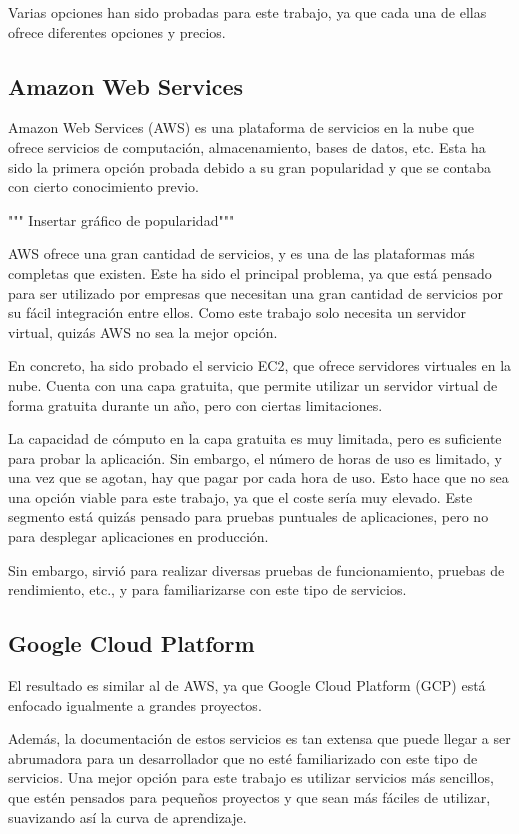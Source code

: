 Varias opciones han sido probadas para este trabajo, ya que cada una de ellas ofrece diferentes opciones y precios.

\subsection{Amazon Web Services}
Amazon Web Services (AWS) es una plataforma de servicios en la nube que ofrece servicios de computación, almacenamiento, bases de datos, etc.
Esta ha sido la primera opción probada debido a su gran popularidad y que se contaba con cierto conocimiento previo.

""" Insertar gráfico de popularidad"""

AWS ofrece una gran cantidad de servicios, y es una de las plataformas más completas que existen.
Este ha sido el principal problema, ya que está pensado para ser utilizado por empresas que necesitan una gran cantidad de servicios por su fácil integración entre ellos.
Como este trabajo solo necesita un servidor virtual, quizás AWS no sea la mejor opción.

En concreto, ha sido probado el servicio EC2, que ofrece servidores virtuales en la nube.
Cuenta con una capa gratuita, que permite utilizar un servidor virtual de forma gratuita durante un año, pero con ciertas limitaciones.

La capacidad de cómputo en la capa gratuita es muy limitada, pero es suficiente para probar la aplicación.
Sin embargo, el número de horas de uso es limitado, y una vez que se agotan, hay que pagar por cada hora de uso.
Esto hace que no sea una opción viable para este trabajo, ya que el coste sería muy elevado.
Este segmento está quizás pensado para pruebas puntuales de aplicaciones, pero no para desplegar aplicaciones en producción.

Sin embargo, sirvió para realizar diversas pruebas de funcionamiento, pruebas de rendimiento, etc., y para familiarizarse con este tipo de servicios.


\subsection{Google Cloud Platform}
El resultado es similar al de AWS, ya que Google Cloud Platform (GCP) está enfocado igualmente a grandes proyectos.

Además, la documentación de estos servicios es tan extensa que puede llegar a ser abrumadora para un desarrollador que no esté familiarizado con este tipo de servicios.
Una mejor opción para este trabajo es utilizar servicios más sencillos, que estén pensados para pequeños proyectos y que sean más fáciles de utilizar, suavizando así la curva de aprendizaje.

